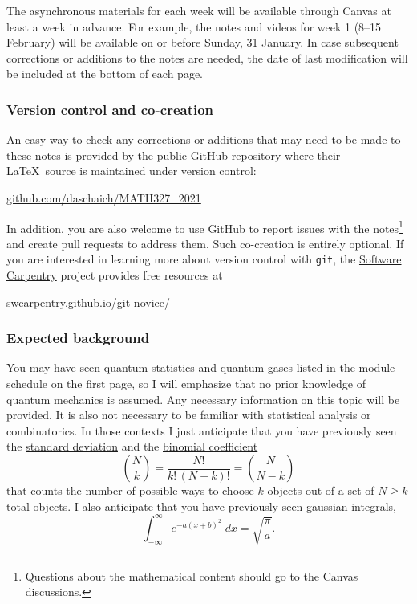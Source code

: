 The asynchronous materials for each week will be available through Canvas at least a week in advance.
For example, the notes and videos for week 1 (8--15 February) will be available on or before Sunday, 31 January.
In case subsequent corrections or additions to the notes are needed, the date of last modification will be included at the bottom of each page.

\subsubsection*{Version control and co-creation}
An easy way to check any corrections or additions that may need to be made to these notes is provided by the public GitHub repository where their \LaTeX\ source is maintained under version control: \\
\centerline{\href{https://github.com/daschaich/MATH327_2021}{github.com/daschaich/MATH327\_2021}}
In addition, you are also welcome to use GitHub to report issues with the notes\footnote{Questions about the mathematical content should go to the Canvas discussions.} and create pull requests to address them.
Such co-creation is entirely optional.
If you are interested in learning more about version control with \texttt{git}, the \href{https://software-carpentry.org}{Software Carpentry} project provides free resources at \\
\centerline{\href{https://swcarpentry.github.io/git-novice/}{swcarpentry.github.io/git-novice/}}

\subsubsection*{Expected background}
You may have seen quantum statistics and quantum gases listed in the module schedule on the first page, so I will emphasize that no prior knowledge of quantum mechanics is assumed.
Any necessary information on this topic will be provided.
%
It is also not necessary to be familiar with statistical analysis or combinatorics.
In those contexts I just anticipate that you have previously seen the \href{https://en.wikipedia.org/wiki/Standard_deviation}{standard deviation} and the \href{https://en.wikipedia.org/wiki/Binomial_coefficient}{binomial coefficient}
\begin{equation*}
  \binom{N}{k} = \frac{N!}{k! \, (N - k)!} = \binom{N}{N - k}
\end{equation*}
that counts the number of possible ways to choose $k$ objects out of a set of $N \geq k$ total objects.
I also anticipate that you have previously seen \href{https://en.wikipedia.org/wiki/Gaussian_integral}{gaussian integrals},
\begin{equation*}
  \int_{-\infty}^{\infty} e^{-a (x + b)^2} \; dx = \sqrt{\frac{\pi}{a}}.
\end{equation*}



